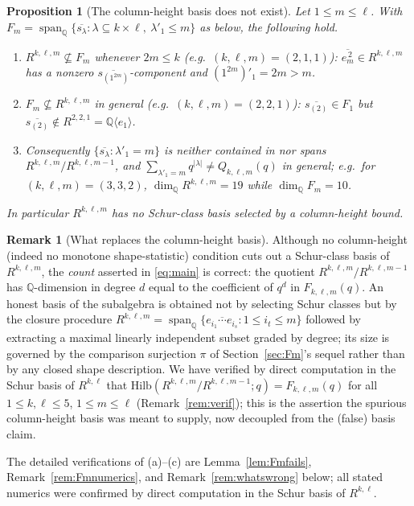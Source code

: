 \documentclass{amsart}
\newtheorem{proposition}{Proposition}
\theoremstyle{definition}
\newtheorem{remark}{Remark}
\newcommand{\Hilb}{\mathrm{Hilb}}
\newcommand{\Q}{\mathbb{Q}}
\newcommand{\rkl}{R^{k,\ell}}
\newcommand{\Rklm}{R^{k,\ell,m}}
\begin{document}
\begin{proposition}[The column-height basis does not exist]\label{prop:nocolbasis}
Let $1\le m\le\ell$. With
$F_m=\operatorname{span}_\Q\{\overline{s_\lambda}:\lambda\subseteq k\times\ell,\
\lambda'_1\le m\}$ as below, the following hold.
\begin{enumerate}
\item[\textup{(a)}] $\Rklm\not\subseteq F_m$ whenever $2m\le k$ \textup{(}e.g.\
$(k,\ell,m)=(2,1,1)$\textup{)}: $\overline{e_m^{\,2}}\in\Rklm$ has a nonzero
$\overline{s_{(1^{2m})}}$-component and $(1^{2m})'_1=2m>m$.
\item[\textup{(b)}] $F_m\not\subseteq\Rklm$ in general \textup{(}e.g.\
$(k,\ell,m)=(2,2,1)$\textup{)}: $\overline{s_{(2)}}\in F_1$ but
$\overline{s_{(2)}}\notin R^{2,2,1}=\Q\langle e_1\rangle$.
\item[\textup{(c)}] Consequently $\{\overline{s_\lambda}:\lambda'_1=m\}$ is
neither contained in nor spans $\Rklm/R^{k,\ell,m-1}$, and
$\sum_{\lambda'_1=m}q^{|\lambda|}\ne Q_{k,\ell,m}(q)$ in general; e.g.\ for
$(k,\ell,m)=(3,3,2)$, $\dim_\Q\Rklm=19$ while $\dim_\Q F_m=10$.
\end{enumerate}
In particular $\Rklm$ has no Schur-class basis selected by a column-height bound.
\end{proposition}

\begin{remark}[What replaces the column-height basis]\label{rem:replacement}
Although no column-height (indeed no monotone shape-statistic) condition cuts out a
Schur-class basis of $\Rklm$, the \emph{count} asserted in \eqref{eq:main} is correct:
the quotient $\Rklm/R^{k,\ell,m-1}$ has $\Q$-dimension in degree $d$ equal to the
coefficient of $q^d$ in $F_{k,\ell,m}(q)$. An honest basis of the subalgebra is
obtained not by selecting Schur classes but by the closure procedure
$\Rklm=\operatorname{span}_\Q\{\overline{e_{i_1}\cdots e_{i_s}}:1\le i_t\le m\}$
followed by extracting a maximal linearly independent subset graded by degree; its
size is governed by the comparison surjection $\pi$ of
Section~\ref{sec:Fm}'s sequel rather than by any closed shape description. We
have verified by direct computation in the Schur basis of $\rkl$ that
$\Hilb(\Rklm/R^{k,\ell,m-1};q)=F_{k,\ell,m}(q)$ for all $1\le k,\ell\le5$,
$1\le m\le\ell$ (Remark~\ref{rem:verif}); this is the assertion the spurious
column-height basis was meant to supply, now decoupled from the (false) basis claim.
\end{remark}

The detailed verifications of \textup{(a)}--\textup{(c)} are
Lemma~\ref{lem:Fmfails}, Remark~\ref{rem:Fmnumerics}, and
Remark~\ref{rem:whatswrong} below; all stated numerics were confirmed by direct
computation in the Schur basis of $\rkl$.
\end{document}
